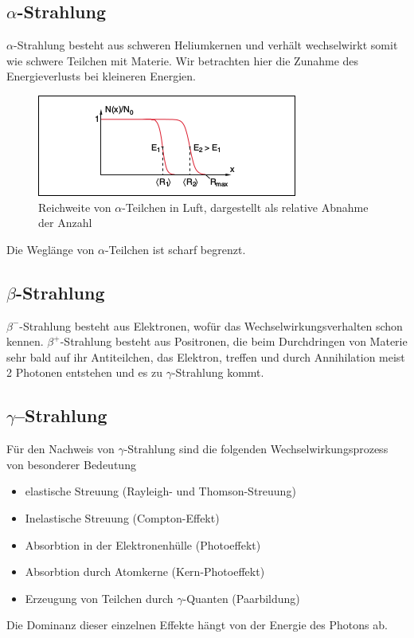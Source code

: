 \documentclass[Ex4_Zusammenfassung.tex]{subfiles}
\begin{document}
\subsection*{$\alpha$-Strahlung}
$\alpha$-Strahlung besteht aus schweren Heliumkernen und verhält wechselwirkt somit wie schwere Teilchen mit Materie. Wir betrachten hier die Zunahme des Energieverlusts bei kleineren Energien.

\begin{figure}[H]
	\centering
	\includegraphics{alpha-Strahlung_Reichweite.png}
	\caption{Reichweite von $\alpha$-Teilchen in Luft, dargestellt als relative Abnahme der Anzahl}
\end{figure}

Die Weglänge von $\alpha$-Teilchen ist scharf begrenzt.

\subsection*{$\beta$-Strahlung}
$\beta^-$-Strahlung besteht aus Elektronen, wofür das Wechselwirkungsverhalten schon kennen. \newline
$\beta^+$-Strahlung besteht aus Positronen, die beim Durchdringen von Materie sehr bald auf ihr Antiteilchen, das Elektron, treffen und durch Annihilation meist 2 Photonen entstehen und es zu $\gamma$-Strahlung kommt.
\newpage
\subsection*{$\gamma$--Strahlung}
Für den Nachweis von $\gamma$-Strahlung sind die folgenden Wechselwirkungsprozess von besonderer Bedeutung
\begin{itemize}
\item elastische Streuung (Rayleigh- und Thomson-Streuung)
\item Inelastische Streuung (Compton-Effekt)
\item Absorbtion in der Elektronenhülle (Photoeffekt)
\item Absorbtion durch Atomkerne (Kern-Photoeffekt)
\item Erzeugung von Teilchen durch $\gamma$-Quanten (Paarbildung)
\end{itemize}
Die Dominanz dieser einzelnen Effekte hängt von der Energie des Photons ab.
\end{document}
